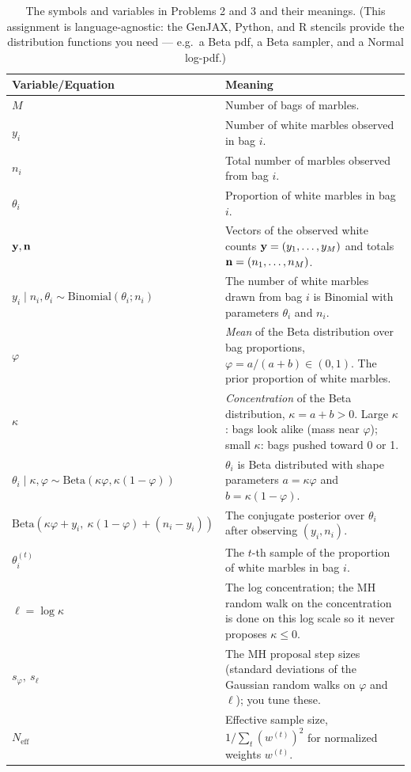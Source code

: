 \documentclass[11pt]{article}
\begin{document}
\begin{table}
\begin{center}
\begin{tabular}{|l|p{4.0in}|}
\hline
Variable/Equation & Meaning \\
\hline \hline
$M$  & Number of bags of marbles. \\
$y_i$ & Number of white marbles observed in bag $i$. \\
$n_i$ & Total number of marbles observed from bag $i$. \\
$\theta_i$ & Proportion of white marbles in bag $i$. \\
${\bf y}, {\bf n}$ & Vectors of the observed white counts ${\bf y}=(y_1,\dotsc,y_M)$ and totals ${\bf n}=(n_1,\dotsc,n_M)$. \\
$y_i \mid n_i, \theta_i \sim \mathrm{Binomial}(\theta_i; n_i)$ & The number of white marbles drawn from bag $i$ is Binomial with parameters $\theta_i$ and $n_i$. \\
$\varphi$ & {\em Mean} of the Beta distribution over bag proportions, $\varphi = a/(a+b) \in (0,1)$. The prior proportion of white marbles. \\
$\kappa$ & {\em Concentration} of the Beta distribution, $\kappa = a+b > 0$. Large $\kappa$: bags look alike (mass near $\varphi$); small $\kappa$: bags pushed toward 0 or 1. \\
$\theta_i \mid \kappa,\varphi \sim \mathrm{Beta}(\kappa\varphi, \kappa(1-\varphi))$ & $\theta_i$ is Beta distributed with shape parameters $a = \kappa\varphi$ and $b = \kappa(1-\varphi)$. \\
$\mathrm{Beta}(\kappa\varphi + y_i,\ \kappa(1-\varphi)+(n_i-y_i))$ & The conjugate posterior over $\theta_i$ after observing $(y_i,n_i)$. \\
$\theta_i^{(t)}$ & The $t$-th sample of the proportion of white marbles in bag $i$. \\
$\ell = \log\kappa$ & The log concentration; the MH random walk on the concentration is done on this log scale so it never proposes $\kappa \le 0$. \\
$s_\varphi,\ s_\ell$ & The MH proposal step sizes (standard deviations of the Gaussian random walks on $\varphi$ and $\ell$); you tune these. \\
$N_{\mathrm{eff}}$ & Effective sample size, $1/\sum_t (w^{(t)})^2$ for normalized weights $w^{(t)}$. \\
\hline
\end{tabular}
\end{center}
\caption{The symbols and variables in Problems 2 and 3 and their meanings. (This assignment is language-agnostic: the GenJAX, Python, and R stencils provide the distribution functions you need --- e.g.\ a Beta pdf, a Beta sampler, and a Normal log-pdf.)}
\end{table}



\end{document}
